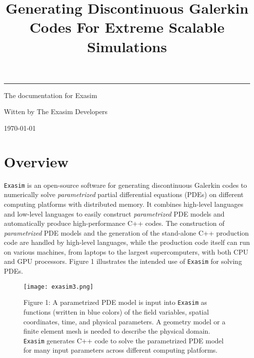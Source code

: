 \documentclass[11pt]{article}
\date{}
\begin{document}
    
        \title{\huge Generating Discontinuous Galerkin Codes For Extreme Scalable Simulations}
        
    \maketitle

 \rule{16.4cm}{0.25cm} 

\hspace{8cm} {\large The documentation for Exasim}

\hspace{8cm}    {\large Witten by The Exasim Developers}

        
\hspace{8cm} {\large \today}
    
\vspace{6cm}

    
    \newpage
    
\section{Overview}

\texttt{Exasim} is an open-source software for generating discontinuous Galerkin codes to numerically solve {\em parametrized} partial differential equations (PDEs) on different computing platforms with distributed memory.  It combines high-level languages  and low-level languages to easily construct {\em parametrized} PDE models and automatically produce high-performance C++ codes. The construction of {\em parametrized} PDE models and the generation of the stand-alone C++ production code are handled by high-level languages, while the production code itself can run on various machines, from laptops to the largest supercomputers, with both CPU and GPU processors. Figure 1 illustrates  the intended use of \texttt{Exasim} for solving PDEs.


\begin{figure}[th]
\begin{center}
\texttt{[image: exasim3.png]} \\
\label{fig1}
\end{center}
Figure 1:   A parametrized PDE model is input into  \texttt{Exasim} as functions (written in blue colors) of the field variables, spatial coordinates, time, and physical parameters.  A geometry model or a finite element mesh is needed to describe the physical domain.  \texttt{Exasim} generates C++ code to solve the parametrized PDE model for many input parameters across different computing platforms. 
\end{figure}
\end{document}
